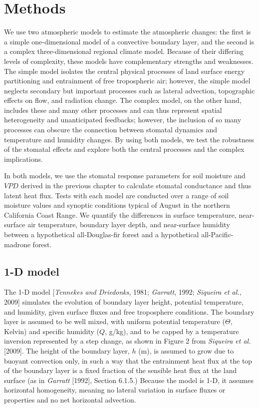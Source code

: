 \section{Methods}

We use two atmospheric models to estimate the atmospheric changes: the first is a simple one-dimensional model of a convective boundary layer, and the second is a complex three-dimensional regional climate model.  Because of their differing levels of complexity, these models have complementary strengths and weaknesses.  The simple model isolates the central physical processes of land surface energy partitioning and entrainment of free tropospheric air; however, the simple model neglects secondary but important processes such as lateral advection, topographic effects on flow, and radiation change.  The complex model, on the other hand, includes these and many other processes and can thus represent spatial heterogeneity and unanticipated feedbacks; however, the inclusion of so many processes can obscure the connection between stomatal dynamics and temperature and humidity changes.  By using both models, we test the robustness of the stomatal effects and explore both the central processes and the complex implications.

In both models, we use the stomatal response parameters for soil moisture and $VPD$ derived in the previous chapter to calculate stomatal conductance and thus latent heat flux.  Tests with each model are conducted over a range of soil moisture values and synoptic conditions typical of August in the northern California Coast Range.  We quantify the differences in surface temperature, near-surface air temperature, boundary layer depth, and near-surface humidity between a hypothetical all-Douglas-fir forest and a hypothetical all-Pacific-madrone forest.

\subsection{1-D model}
The 1-D model [\textit{Tennekes and Driedonks}, 1981; \textit{Garratt}, 1992; \textit{Siqueira et al.}, 2009] simulates the evolution of boundary layer height, potential temperature, and humidity, given surface fluxes and free troposphere conditions.  The boundary layer is assumed to be well mixed, with uniform potential temperature ($\Theta$, Kelvin) and specific humidity ($Q$, g/kg), and to be capped by a temperature inversion represented by a step change, as shown in Figure 2 from \textit{Siqueira et al.} [2009].  The height of the boundary layer, $h$ (m), is assumed to grow due to buoyant convection only, in such a way that the entrainment heat flux at the top of the boundary layer is a fixed fraction of the sensible heat flux at the land surface (as in \textit{Garratt} [1992], Section 6.1.5.)  Because the model is 1-D, it assumes horizontal homogeneity, meaning no lateral variation in surface fluxes or properties and no net horizontal advection.

